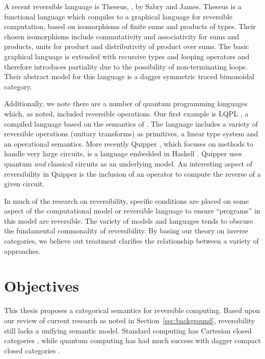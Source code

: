 A recent reversible language is Theseus, \cite{james2014theseus}, by Sabry and James. Theseus is a
functional language which compiles to a graphical language
\cite{james2013isomorphic,james2012information} for reversible computation, based on
isomorphisms of finite sums and products of types. Their chosen isomorphisms include commutativity
and associativity for sums and products, units for product and distributivity of product over
sums. The basic graphical language is extended with recursive types and looping operators and
therefore introduces partiality due to the possibility of non-terminating loops. Their abstract
model for this language is a dagger symmetric traced bimonoidal category\cite{selinger05:dagger}.

Additionally, we note there are a number of quantum programming languages which, as noted, included
reversible operations. Our first example is LQPL \cite{giles2007}, a compiled language based on the
semantics of \cite{selinger04:qpl}. The language includes a variety of reversible operations
(unitary transforms) as primitives, a linear type system and an operational semantics. More recently
Quipper \cite{green2013introduction,green2013quipper}, which focuses on methods to handle very large
circuits, is a language embedded in Haskell \cite{peyton2003:haskell98}. Quipper uses quantum
\emph{and} classical circuits as an underlying model. An interesting aspect of reversibility in
Quipper is the inclusion of an operator to compute the reverse of a given circuit.

In much of the research on reversibility, specific conditions are placed on some aspect of the
computational model or reversible language to ensure ``programs'' in this model are reversible.
The variety of models and languages tends to obscure the fundamental commonality of reversibility.
By basing our theory on inverse categories, we believe out treatment clarifies the relationship
between a variety of approaches.


\section{Objectives}
\label{sec:objectives}

This thesis proposes a categorical semantics for reversible computing. Based upon our review of
current research as noted in Section~\ref{sec:background}, reversibility still lacks a unifying
semantic model. Standard computing has Cartesian closed categories \cite{barr:ctcs}, while quantum
computing has had much success with dagger compact closed categories
\cite{selinger04:towardssemantics,selinger05:dagger,abramsky05:abstractscalars}.

